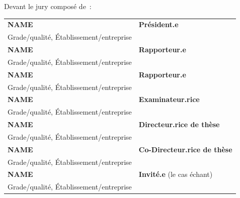 \documentclass{article}
\begin{document}
\begin{titlepage}
\begin{center}
\end{center}

Devant le jury composé de~:\\

\small {
\begin{tabular}{ll}
\textbf{NAME}           &\textbf{Président.e}\\
  Grade/qualité, Établissement/entreprise\\
\textbf{NAME}           &\textbf{Rapporteur.e}\\
	Grade/qualité, Établissement/entreprise\\
\textbf{NAME}           &\textbf{Rapporteur.e}\\
	Grade/qualité, Établissement/entreprise\\
\textbf{NAME}           &\textbf{Examinateur.rice}\\
	Grade/qualité, Établissement/entreprise\\
\textbf{NAME}           &\textbf{Directeur.rice de thèse}\\
	Grade/qualité, Établissement/entreprise\\
\textbf{NAME} 		&\textbf{Co-Directeur.rice de thèse}\\
	Grade/qualité, Établissement/entreprise\\		
\textbf{NAME}     &\textbf{Invité.e} (le cas échant)\\
  Grade/qualité, Établissement/entreprise\\
\end{tabular}
}


\end{titlepage}
\end{document}
